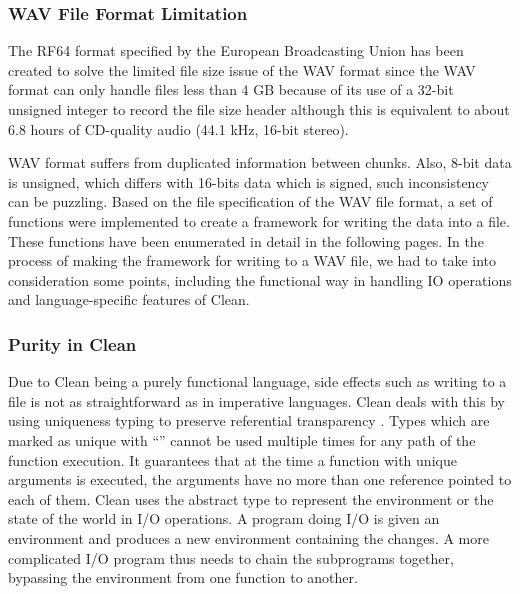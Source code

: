 \documentclass[runningheads]{llncs}
\begin{document}
\subsubsection{WAV File Format Limitation} 

The RF64 format specified by the European Broadcasting Union has been created to solve the limited file size issue of the WAV format since the WAV format can only handle files less than 4 GB because of its use of a 32-bit unsigned integer to record the file size header although this is equivalent to about 6.8 hours of CD-quality audio (44.1 kHz, 16-bit stereo). 

WAV format suffers from duplicated information between chunks. Also, 8-bit data is unsigned, which differs with 16-bits data which is signed, such inconsistency can be puzzling.
Based on the file specification of the WAV file format, a set of functions were implemented to create a framework for writing the data into a file. These functions have been enumerated in detail in the following pages.
In the process of making the framework for writing to a WAV file, we had to take into consideration some points, including the functional way in handling IO operations and language-specific features of Clean.

\subsubsection{Purity in Clean}
Due to Clean being a purely functional language, side effects such as
writing to a file is not as straightforward as in imperative languages.
Clean deals with this by using uniqueness typing to preserve referential
transparency \cite{clean}. Types which are marked as unique with
``\Cl{*}'' cannot be used multiple times for any path of the function
execution. It guarantees that at the time a function with unique
arguments is executed, the arguments have no more than one reference
pointed to each of them.
Clean uses the \label{gloss:world} abstract type to represent the
environment or the state of the world in I/O operations. A program doing
I/O is given an environment and produces a new environment containing
the changes. A more complicated I/O program thus needs to chain the
subprograms together, bypassing the environment from one function to
another.
\end{document}
